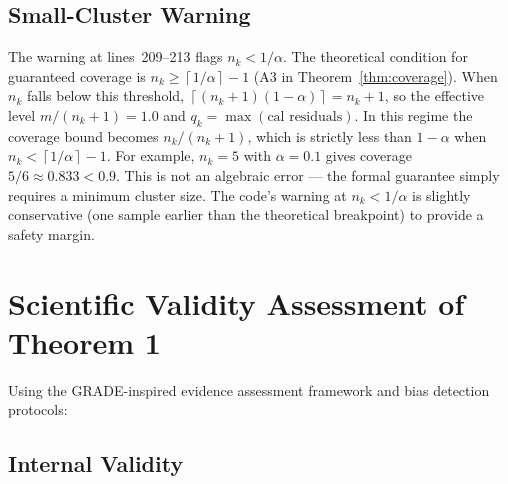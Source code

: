 \documentclass[11pt]{article}
\newcommand{\ceil}[1]{\left\lceil #1 \right\rceil}
\begin{document}
\subsection*{Small-Cluster Warning}

The warning at lines~209--213 flags $n_k < 1/\alpha$. The theoretical condition for guaranteed coverage is $n_k \geq \ceil{1/\alpha} - 1$ (A3 in Theorem~\ref{thm:coverage}). When $n_k$ falls below this threshold, $\ceil{(n_k+1)(1-\alpha)} = n_k+1$, so the effective level $m/(n_k+1) = 1.0$ and $q_k = \max(\text{cal residuals})$. In this regime the coverage bound becomes $n_k/(n_k+1)$, which is strictly less than $1-\alpha$ when $n_k < \ceil{1/\alpha} - 1$. For example, $n_k = 5$ with $\alpha = 0.1$ gives coverage $5/6 \approx 0.833 < 0.9$. This is not an algebraic error --- the formal guarantee simply requires a minimum cluster size. The code's warning at $n_k < 1/\alpha$ is slightly conservative (one sample earlier than the theoretical breakpoint) to provide a safety margin.

\section{Scientific Validity Assessment of Theorem 1}

Using the GRADE-inspired evidence assessment framework and bias detection protocols:

\subsection*{Internal Validity}
\end{document}
